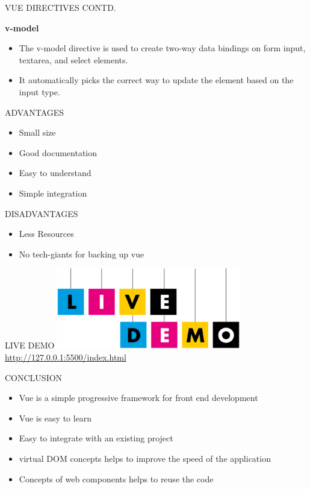 \documentclass[aspectratio=169, 169]{beamer}
\newcommand\myheading[1]{%
  \par\bigskip
  {\Large\bfseries#1}\par\smallskip}
\begin{document}
\begin{frame}{VUE DIRECTIVES CONTD.}
    \myheading{v-model}
  \begin{itemize}
      \item The v-model directive is  used to create two-way data bindings on form input, textarea, and select elements. 
      \item It automatically picks the correct way to update the element based on the input type. 
      
  \end{itemize}
\end{frame}
\begin{frame}{ ADVANTAGES }
    \begin{itemize}
        \item Small size
        \item Good documentation 
        \item Easy to understand
        \item Simple integration
    \end{itemize}
\end{frame}
\begin{frame}{ DISADVANTAGES }
    \begin{itemize}
        \item Less Resources
        \item No tech-giants for backing up vue
    \end{itemize}
\end{frame}
\begin{frame}{LIVE DEMO}
    \center\includegraphics[width=8cm]{livedemo.png}
     \center\larege\url{http://127.0.0.1:5500/index.html}
\end{frame}
\begin{frame}{CONCLUSION}
    \begin{itemize}
        \item Vue is a simple progressive framework for front end development
        \item Vue is easy to learn 
        \item Easy to integrate with an existing project
        \item virtual DOM concepts helps to improve the speed of the application
        \item Concepts of web components helps to reuse the code
    \end{itemize}
\end{frame}
\end{document}
